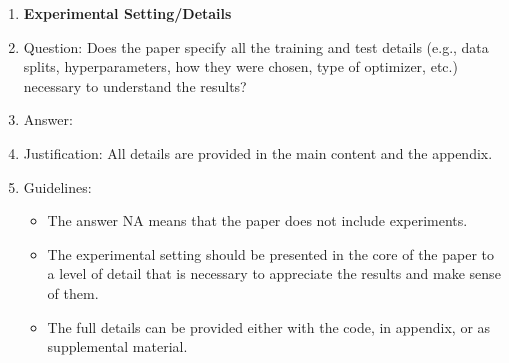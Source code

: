 \documentclass[letterpaper]{article}
\begin{document}
\begin{enumerate}
\item {\bf Experimental Setting/Details}
    \item[] Question: Does the paper specify all the training and test details (e.g., data splits, hyperparameters, how they were chosen, type of optimizer, etc.) necessary to understand the results?
    \item[] Answer: \answerYes{} %
    \item[] Justification: All details are provided in the main content and the appendix.
    \item[] Guidelines:
    \begin{itemize}
        \item The answer NA means that the paper does not include experiments.
        \item The experimental setting should be presented in the core of the paper to a level of detail that is necessary to appreciate the results and make sense of them.
        \item The full details can be provided either with the code, in appendix, or as supplemental material.
    \end{itemize}


\end{enumerate}
\end{document}
